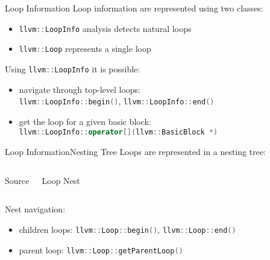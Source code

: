\documentclass[10pt,mathserif]{beamer}
\newcommand{\cinput}[1]{}
\newcommand{\cppinline}[1]{\lstinline[language=C++]!#1!}
\begin{document}
\begin{frame}{Loop Information}
Loop information are represented using two classes:

\begin{itemize}
\item \cppinline{llvm::LoopInfo} analysis detects natural loops
\item \cppinline{llvm::Loop} represents a single loop
\end{itemize}

Using \cppinline{llvm::LoopInfo} it is possible:

\begin{itemize}
\item navigate through top-level loops: \\
      \cppinline{llvm::LoopInfo::begin()}, \cppinline{llvm::LoopInfo::end()}
\item get the loop for a given basic block: \\
      \cppinline{llvm::LoopInfo::operator[](llvm::BasicBlock *)}
\end{itemize}
\end{frame}

\begin{frame}{Loop Information}{Nesting Tree}
Loops are represented in a \alert{nesting tree}:

\begin{columns}[t]
\begin{block}{Source}
\centering
\cinput{snippet/02/loop-nest.c}
\end{block}

\begin{block}{Loop Nest}
\centering

\end{block}
\end{columns}

Nest navigation:

\begin{itemize}
\item children loops: \cppinline{llvm::Loop::begin()},
      \cppinline{llvm::Loop::end()}
\item parent loop: \cppinline{llvm::Loop::getParentLoop()}
\end{itemize}
\end{frame}
\end{document}
